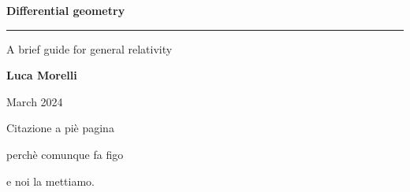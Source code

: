 \begin{titlepage}
	\vspace*{5cm}
	\begin{center}
	\huge \textbf{Differential geometry}
	
	\rule{7cm}{0.4pt} 
	
	\LARGE A brief guide for general relativity
	
	\vspace{40pt}
	
	\LARGE \textbf{Luca Morelli}
	
	\vspace{20pt}
	
	\LARGE March 2024
	
	\end{center}
   
   \vspace{200pt}
   
    \begin{flushright}
    	Citazione a piè pagina
    	
    	perchè comunque fa figo
    	
    	e noi la mettiamo.
    \end{flushright}	
\end{titlepage}